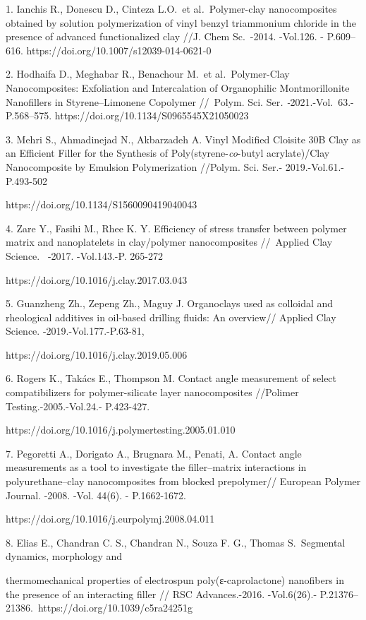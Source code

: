 \begin{noparindent}
1. Ianchis R., Donescu D., Cinteza L.O.~et al\emph{.}~Polymer-clay
nanocomposites obtained by solution polymerization of vinyl benzyl
triammonium chloride in the presence of advanced functionalized clay
//J. Chem Sc.~-2014. -Vol.126. - P.609--616.
https://doi.org/10.1007/s12039-014-0621-0

2. Hodhaifa D., Meghabar R., Benachour M.~et al\emph{.}~Polymer-Clay
Nanocomposites: Exfoliation and Intercalation of Organophilic
Montmorillonite Nanofillers in Styrene--Limonene Copolymer //~Polym.
Sci. Ser\emph{. -}2021.-Vol.~63.- P.568--575.
https://doi.org/10.1134/S0965545X21050023

3. Mehri S., Ahmadinejad N., Akbarzadeh A. Vinyl Modified Cloisite 30B
Clay as an Efficient Filler for the Synthesis of
Poly(styrene-\emph{co}-butyl acrylate)/Clay Nanocomposite by Emulsion
Polymerization //Polym. Sci. Ser.- 2019.-Vol.61.-P.493-502

https://doi.org/10.1134/S1560090419040043

4. Zare Y., Fasihi M., Rhee K. Y. Efficiency of stress transfer between
polymer matrix and nanoplatelets in clay/polymer nanocomposites
//~Applied Clay Science.~ -2017. -Vol.143.-P. 265-272

https://doi.org/10.1016/j.clay.2017.03.043

5. Guanzheng Zh., Zepeng Zh., Maguy J. Organoclays used as colloidal and
rheological additives in oil-based drilling fluids: An overview//
Applied Clay Science. -2019.-Vol.177.-P.63-81,

https://doi.org/10.1016/j.clay.2019.05.006

6. Rogers K., Takács E., Thompson M. Contact angle measurement of select
compatibilizers for polymer-silicate layer nanocomposites //Polimer
Testing.-2005.-Vol.24.- P.423-427.

https://doi.org/10.1016/j.polymertesting.2005.01.010

7. Pegoretti A., Dorigato A., Brugnara M., Penati, A. Contact angle
measurements as a tool to investigate the filler--matrix interactions in
polyurethane--clay nanocomposites from blocked prepolymer// European
Polymer Journal. -2008. -Vol. 44(6). - P.1662-1672.~

https://doi.org/10.1016/j.eurpolymj.2008.04.011

8. Elias E., Chandran C. S., Chandran N., Souza F. G., Thomas
S.~Segmental dynamics, morphology and

thermomechanical properties of
electrospun poly(ε-caprolactone) nanofibers in the presence of an
interacting filler // RSC Advances.-2016. -Vol.6(26).-
P.21376--21386.~https://doi.org/10.1039/c5ra24251g


\end{noparindent}
